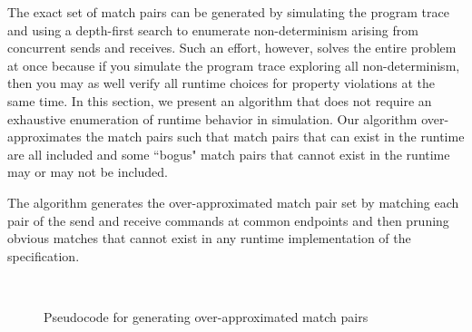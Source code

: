 The exact set of match pairs can be generated by simulating the program trace and using a depth-first search to enumerate non-determinism arising from concurrent sends and receives. Such an effort, however, solves the entire problem at once because if you simulate the program trace exploring all non-determinism, then you may as well verify all runtime choices for property violations at the same time. In this section, we present an algorithm that does not require an exhaustive enumeration of runtime behavior in simulation. Our algorithm over-approximates the match pairs such that match pairs that can exist in the runtime are all included and some ``bogus" match pairs that cannot exist in the runtime may or may not be included. %

The algorithm generates the over-approximated match pair set by
matching each pair of the send and receive commands at common
endpoints and then pruning obvious matches that cannot exist in any
runtime implementation of the specification.

\begin{figure}[h]
\setlength{\tabcolsep}{20pt}
\begin{center}
\scalebox{0.7}{\usebox{\boxalgorithm}}\\
\end{center}
\caption{Pseudocode for generating over-approximated match pairs}
\label{fig:pseudocode}
\end{figure}


